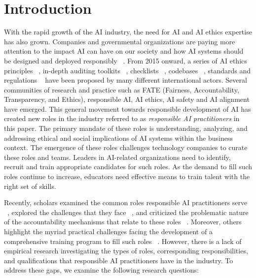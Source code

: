 \documentclass[sigconf]{acmart}
\begin{document}
\section{Introduction}
With the rapid growth of the \ac{AI} industry, the need for AI and AI ethics expertise has also grown. Companies and governmental organizations are paying more attention to the impact \ac{AI} can have on our society and how \ac{AI} systems should be designed and deployed responsibly ~\cite{Jobin2019,Fjeld2020-rb,Pak-Hang_Wong2020-jv}. From 2015 onward, a series of \ac{AI} ethics principles ~\cite{Jobin2019}, in-depth auditing toolkits ~\cite{Raji2020a, Moon2019, Andersona}, checklists ~\cite{canada, Madaio2020}, codebases ~\cite{microsoft,ibm}, standards and regulations ~\cite{eu, ieee} have been proposed by many different international actors. Several communities of research and practice such as FATE (Fairness, Accountability, Transparency, and Ethics), responsible \ac{AI}, \ac{AI} ethics, \ac{AI} safety and \ac{AI} alignment have emerged. This general movement towards responsible development of \ac{AI} has created new roles in the industry referred to as \textit{responsible AI practitioners} in this paper. The primary mandate of these roles is understanding, analyzing, and addressing ethical and social implications of \ac{AI} systems within the business context. The emergence of these roles challenges technology companies to curate these roles and teams. Leaders in \ac{AI}-related organizations need to identify, recruit and train appropriate candidates for such roles. As the demand to fill such roles continue to increase, educators need effective means to train talent with the right set of skills. 

Recently, scholars examined the common roles responsible AI practitioners serve ~\cite{Wang2023-js,Gambelin2021}, explored the challenges that they face ~\cite{Moss2020, Rakova2021c}, and criticized the problematic nature of the accountability mechanisms that relate to these roles ~\cite{Costanza-Chock2022-ch}. Moreover, others highlight the myriad practical challenges facing the development of a comprehensive training program to fill such roles ~\cite{Raji2021,Borenstein2021,Garrett2020-dw}. However, there is a lack of empirical research investigating the types of roles, corresponding responsibilities, and qualifications that responsible AI practitioners have in the industry. To address these gaps, we examine the following research questions: 
\end{document}
